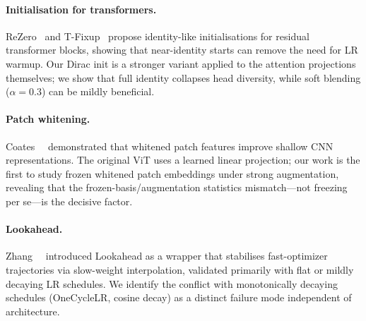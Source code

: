\paragraph{Initialisation for transformers.}
ReZero~\cite{bachlechner2021rezero} and T-Fixup~\cite{huang2020improve} propose identity-like initialisations for residual transformer blocks, showing that near-identity starts can remove the need for LR warmup.
Our Dirac init is a stronger variant applied to the attention projections themselves; we show that full identity collapses head diversity, while soft blending ($\alpha{=}0.3$) can be mildly beneficial.

\paragraph{Patch whitening.}
Coates~\etal~\cite{coates2011importance} demonstrated that whitened patch features improve shallow CNN representations.
The original ViT uses a learned linear projection; our work is the first to study frozen whitened patch embeddings under strong augmentation, revealing that the frozen-basis/augmentation statistics mismatch---not freezing per se---is the decisive factor.

\paragraph{Lookahead.}
Zhang~\etal~\cite{zhang2019lookahead} introduced Lookahead as a wrapper that stabilises fast-optimizer trajectories via slow-weight interpolation, validated primarily with flat or mildly decaying LR schedules.
We identify the conflict with monotonically decaying schedules (OneCycleLR, cosine decay) as a distinct failure mode independent of architecture.

